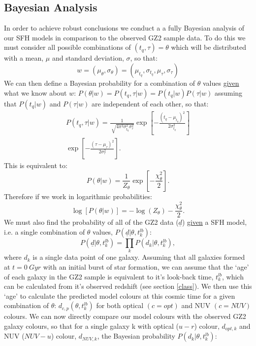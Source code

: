 \documentclass{mn2e}
\begin{document}
\subsection{Bayesian Analysis}\label{stats}
In order to achieve robust conclusions we conduct a a fully Bayesian analysis \citep{Sivia, MacKay} of our SFH models in comparison to the observed GZ2 sample data. To do this we must consider all possible combinations of $(t_{q}, \tau) = \theta$ which will be distributed with a mean, $\mu$ and standard deviation, $\sigma$, so that:
\begin{equation*}
w = (\mu_{\theta}, \sigma_{\theta}) = (\mu_{t_{q}}, \sigma_{t_{q}}, \mu_{\tau}, \sigma_{\tau})
\end{equation*}
We can then define a Bayesian probability for a combination of $\theta$ values \underline{given} what we know about $w$: $P(\theta|w) = P(t_{q}, \tau|w) = P(t_{q}|w)P(\tau|w)$ assuming that $ P(t_{q}|w)$ and $P(\tau|w)$ are independent of each other, so that:
\begin{multline*}
P(t_{q}, \tau|w) = \frac{1}{\sqrt[]{4\pi^2\sigma^2_{t_{q}}\sigma^2_{\tau}}} \exp\left[-\frac{(t_{q}-\mu_{t_{q}})^2}{2\sigma^2_{t_{q}}}\right] \\ \exp\left[-\frac{(\tau-\mu_{\tau})^2}{2\sigma^2_{\tau}}\right].
\end{multline*}
This is equivalent to:
\begin{equation*}
P(\theta|w) = \frac{1}{Z_{\theta}} \exp\left[-\frac{\chi_{\theta}^2}{2}\right].
\end{equation*}
Therefore if we work in logarithmic probabilities:
\begin{equation*}
\log[P(\theta|w)] = - \log(Z_{\theta}) - \frac{\chi_{\theta}^2}{2}.
\end{equation*}
We must also find the probability of all of the GZ2 data ($\underline{d}$) \underline{given} a SFH model, i.e. a single combination of $\theta$ values, $P(\underline{d}|\theta, t_{k}^{lb})$:
\begin{equation*}
P(\underline{d}|\theta, t_{k}^{lb}) = \prod_{k} P(d_{k}|\theta, t_{k}^{lb}),
\end{equation*}
where $d_{k}$ is a single data point of one galaxy. Assuming that all galaxies formed at $t=0~Gyr$ with an initial burst of star formation, we can assume that the `age' of each galaxy in the GZ2 sample is equivalent to it's look-back time, $t^{lb}_{k}$, which can be calculated from it's observed redshift (see section \ref{class}). We then use this  `age' to calculate the predicted model colours at this cosmic time for a given combination of $\theta$: $d_{c,p}(\theta, t^{lb}_{k})$ for both optical $(c=opt)$ and NUV $(c=NUV)$ colours. We can now directly compare our model colours with the observed GZ2 galaxy colours, so that for a single galaxy k with optical ($u-r$) colour, $d_{opt, k}$ and NUV ($NUV-u$) colour, $d_{NUV,k}$, the Bayesian probability $P(d_{k}|\theta, t^{lb}_{k})$:
\end{document}
